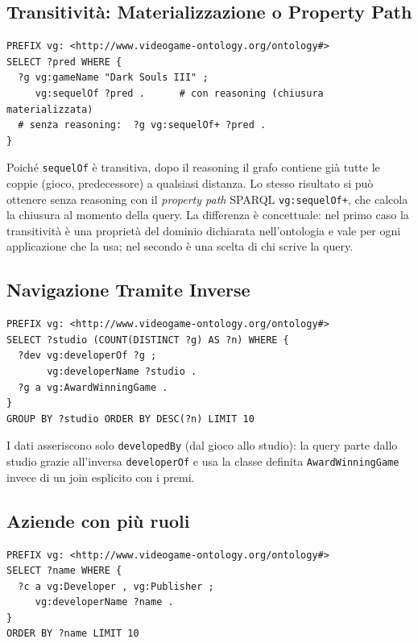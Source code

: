 \subsection{Transitivit\`a: Materializzazione o Property Path}

\begin{lstlisting}[style=sparql, caption={Tutti i predecessori di un gioco}, label={lst:q_trans}]
PREFIX vg: <http://www.videogame-ontology.org/ontology#>
SELECT ?pred WHERE {
  ?g vg:gameName "Dark Souls III" ;
     vg:sequelOf ?pred .      # con reasoning (chiusura materializzata)
  # senza reasoning:  ?g vg:sequelOf+ ?pred .
}
\end{lstlisting}

Poich\'e \texttt{sequelOf} \`e transitiva, dopo il reasoning il grafo contiene gi\`a
tutte le coppie (gioco, predecessore) a qualsiasi distanza. Lo stesso risultato si
pu\`o ottenere senza reasoning con il \emph{property path} SPARQL
\texttt{vg:sequelOf+}, che calcola la chiusura al momento della query. La differenza
\`e concettuale: nel primo caso la transitivit\`a \`e una propriet\`a del dominio
dichiarata nell'ontologia e vale per ogni applicazione che la usa; nel secondo \`e
una scelta di chi scrive la query.

\subsection{Navigazione Tramite Inverse}

\begin{lstlisting}[style=sparql, caption={Studi con pi\`u giochi premiati}, label={lst:q_inv}]
PREFIX vg: <http://www.videogame-ontology.org/ontology#>
SELECT ?studio (COUNT(DISTINCT ?g) AS ?n) WHERE {
  ?dev vg:developerOf ?g ;
       vg:developerName ?studio .
  ?g a vg:AwardWinningGame .
}
GROUP BY ?studio ORDER BY DESC(?n) LIMIT 10
\end{lstlisting}

I dati asseriscono solo \texttt{developedBy} (dal gioco allo studio): la query parte
dallo studio grazie all'inversa \texttt{developerOf} e usa la classe definita
\texttt{AwardWinningGame} invece di un join esplicito con i premi.

\subsection{Aziende con pi\`u ruoli}

\begin{lstlisting}[style=sparql, caption={Aziende che sviluppano e pubblicano}, label={lst:q_company}]
PREFIX vg: <http://www.videogame-ontology.org/ontology#>
SELECT ?name WHERE {
  ?c a vg:Developer , vg:Publisher ;
     vg:developerName ?name .
}
ORDER BY ?name LIMIT 10
\end{lstlisting}

